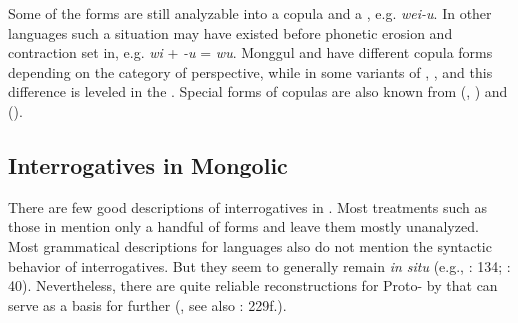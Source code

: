Some of the forms are still analyzable into a copula and a , e.g.  \textit{wei-u}. In other languages such a situation may have existed before phonetic erosion and contraction set in, e.g.  \textit{wi} + \textit{-u} = \textit{wu}. Monggul and  have different copula forms depending on the category of perspective, while in some variants of , , and  this difference is leveled in the . Special  forms of copulas are also known from  (, ) and  ().

\subsection{Interrogatives in Mongolic}\label{sec:5.8.3}

There are few good descriptions of interrogatives in . Most treatments such as those in \citet{Janhunen2003} mention only a handful of forms and leave them mostly unanalyzed. Most grammatical descriptions for  languages also do not mention the syntactic behavior of interrogatives. But they seem to generally remain \textit{in situ} (e.g., \citealt{Fried2010}: 134; \citealt{Napoli2014}: 40). Nevertheless, there are quite reliable reconstructions for Proto- by \citet[20]{Janhunen2003a} that can serve as a basis for further  (, see also \citealt{Poppe1955}: 229f.).

